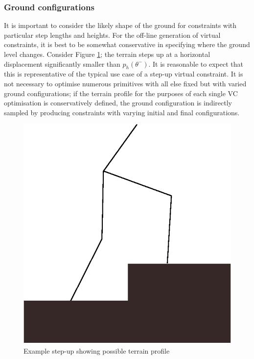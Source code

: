 \subsubsection{Ground configurations} \label{sec:ground}
It is important to consider the likely shape of the ground for constraints with particular step lengths and heights. For the off-line generation of virtual constraints, it is best to be somewhat conservative in specifying where the ground level changes. Consider Figure \ref{fig:stepup}; the terrain steps up at a horizontal displacement significantly smaller than $p_h(\theta^-)$. It is reasonable to expect that this is representative of the typical use case of a step-up virtual constraint. It is not necessary to optimise numerous primitives with all else fixed but with varied ground configurations; if the terrain profile for the purposes of each single VC optimisation is conservatively defined, the ground configuration is indirectly sampled by producing constraints with varying initial and final configurations.

\begin{figure}
	\centering
	\includegraphics[width=0.5\linewidth]{4VirtConstLib/stepup.eps}
	\caption{Example step-up showing possible terrain profile}
	\label{fig:stepup}
\end{figure}

